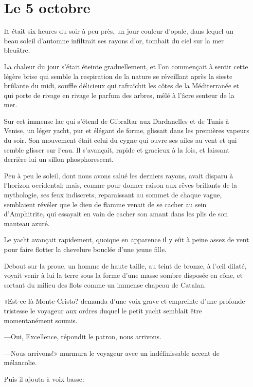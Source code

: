 \chapter{Le 5 octobre}

\lettrine{I}{l} était six heures du soir à peu près, un jour couleur d'opale, dans lequel un beau soleil d'automne infiltrait ses rayons d'or, tombait du ciel sur la mer bleuâtre. 

\zz
La chaleur du jour s'était éteinte graduellement, et l'on commençait à sentir cette légère brise qui semble la respiration de la nature se réveillant après la sieste brûlante du midi, souffle délicieux qui rafraîchit les côtes de la Méditerranée et qui porte de rivage en rivage le parfum des arbres, mêlé à l'âcre senteur de la mer. 

Sur cet immense lac qui s'étend de Gibraltar aux Dardanelles et de Tunis à Venise, un léger yacht, pur et élégant de forme, glissait dans les premières vapeurs du soir. Son mouvement était celui du cygne qui ouvre ses ailes au vent et qui semble glisser sur l'eau. Il s'avançait, rapide et gracieux à la fois, et laissant derrière lui un sillon phosphorescent. 

Peu à peu le soleil, dont nous avons salué les derniers rayons, avait disparu à l'horizon occidental; mais, comme pour donner raison aux rêves brillants de la mythologie, ses feux indiscrets, reparaissant au sommet de chaque vague, semblaient révéler que le dieu de flamme venait de se cacher au sein d'Amphitrite, qui essayait en vain de cacher son amant dans les plis de son manteau azuré. 

Le yacht avançait rapidement, quoique en apparence il y eût à peine assez de vent pour faire flotter la chevelure bouclée d'une jeune fille. 

Debout sur la proue, un homme de haute taille, au teint de bronze, à l'œil dilaté, voyait venir à lui la terre sous la forme d'une masse sombre disposée en cône, et sortant du milieu des flots comme un immense chapeau de Catalan. 

«Est-ce là Monte-Cristo? demanda d'une voix grave et empreinte d'une profonde tristesse le voyageur aux ordres duquel le petit yacht semblait être momentanément soumis. 

—Oui, Excellence, répondit le patron, nous arrivons. 

—Nous arrivons!» murmura le voyageur avec un indéfinissable accent de mélancolie. 

Puis il ajouta à voix basse: 

